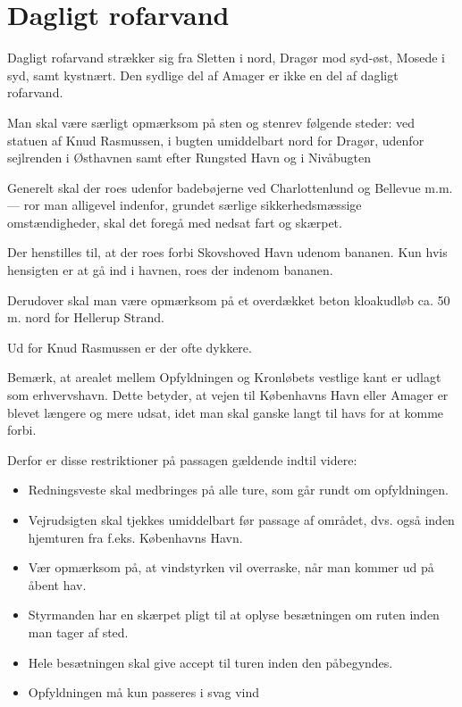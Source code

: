 \documentclass{article}
\begin{document}
\section{Dagligt rofarvand}

Dagligt rofarvand strækker sig fra Sletten i nord, Dragør mod syd-øst,
Mosede i syd, samt kystnært. Den sydlige del af Amager er ikke en del af
dagligt rofarvand.

Man skal være særligt opmærksom på sten og stenrev følgende steder: ved
statuen af Knud Rasmussen, i bugten umiddelbart nord for Dragør, udenfor
sejlrenden i Østhavnen samt efter Rungsted Havn og i Nivåbugten

Generelt skal der roes udenfor badebøjerne ved Charlottenlund og Bellevue
m.m. --- ror man alligevel indenfor, grundet særlige sikkerhedsmæssige
omstændigheder, skal det foregå med nedsat fart og skærpet.

Der henstilles til, at der roes forbi Skovshoved Havn udenom bananen. Kun
hvis hensigten er at gå ind i havnen, roes der indenom bananen.

Derudover skal man være opmærksom på et overdækket beton kloakudløb ca.
50 m. nord for Hellerup Strand.

Ud for Knud Rasmussen er der ofte dykkere.

Bemærk, at arealet mellem Opfyldningen og Kronløbets vestlige kant er
udlagt som erhvervshavn.  Dette betyder, at vejen til Københavns Havn
eller Amager er blevet længere og mere udsat, idet man skal ganske langt
til havs for at komme forbi.

Derfor er disse restriktioner på passagen gældende indtil videre:

\begin{itemize}
    \item Redningsveste skal medbringes på alle ture, som går
        rundt om opfyldningen.

    \item Vejrudsigten skal tjekkes umiddelbart før passage af området,
        dvs. også inden hjemturen fra f.eks.  Københavns Havn.

    \item Vær opmærksom på, at vindstyrken vil overraske, når man kommer
        ud på åbent hav.

    \item Styrmanden har en skærpet pligt til at oplyse besætningen om
        ruten inden man tager af sted.

    \item Hele besætningen skal give accept til turen inden den
        påbegyndes.

    \item Opfyldningen må kun passeres i svag vind
\end{itemize}
\end{document}
